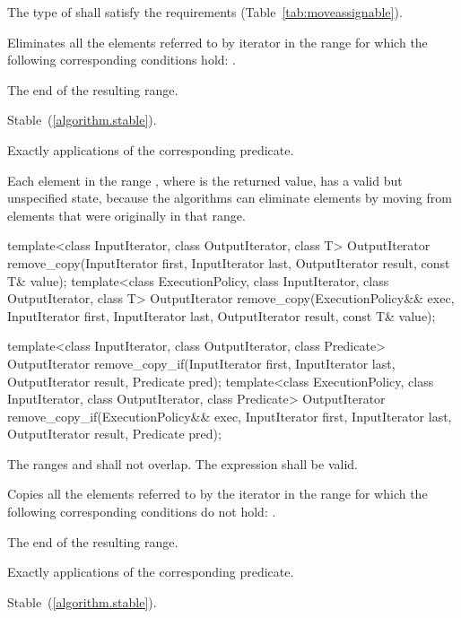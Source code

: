 \begin{itemdescr}
\pnum
\requires
The type of
shall satisfy the 
requirements (Table~\ref{tab:moveassignable}).

\pnum
\effects
Eliminates all the elements referred to by iterator
in the range 
for which the following corresponding conditions hold:
.

\pnum
\returns
The end of the resulting range.

\pnum
\remarks Stable~(\ref{algorithm.stable}).

\pnum
\complexity
Exactly
applications of the corresponding predicate.

\pnum
\begin{note}
Each element in the range , where  is
the returned value, has a valid but unspecified state, because the algorithms
can eliminate elements by moving from elements that were originally
in that range.
\end{note}
\end{itemdescr}

%
%
\begin{itemdecl}
template<class InputIterator, class OutputIterator, class T>
  OutputIterator
    remove_copy(InputIterator first, InputIterator last,
                OutputIterator result, const T& value);
template<class ExecutionPolicy, class InputIterator, class OutputIterator, class T>
  OutputIterator
    remove_copy(ExecutionPolicy&& exec,
                InputIterator first, InputIterator last,
                OutputIterator result, const T& value);

template<class InputIterator, class OutputIterator, class Predicate>
  OutputIterator
    remove_copy_if(InputIterator first, InputIterator last,
                   OutputIterator result, Predicate pred);
template<class ExecutionPolicy, class InputIterator, class OutputIterator, class Predicate>
  OutputIterator
    remove_copy_if(ExecutionPolicy&& exec,
                   InputIterator first, InputIterator last,
                   OutputIterator result, Predicate pred);
\end{itemdecl}

\begin{itemdescr}
\pnum
\requires
The ranges
and
shall not overlap. The expression  shall be valid.

\pnum
\effects
Copies all the elements referred to by the iterator
in the range
for which the following corresponding conditions do not hold:
.

\pnum
\returns
The end of the resulting range.

\pnum
\complexity
Exactly
applications of the corresponding predicate.

\pnum
\remarks Stable~(\ref{algorithm.stable}).
\end{itemdescr}

